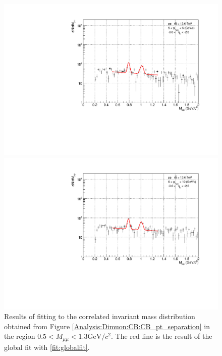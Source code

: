 \begin{figure}[H]
\begin{minipage}{0.45\textwidth}
                    \end{minipage}
                    \\
                    \vspace{1em}
                    \begin{minipage}{0.45\textwidth}
                        \centering
                        \includegraphics[width=\textwidth]{fig/3_4_2_fit_pt_5to6.pdf}
                        \captionsetup{labelformat=empty}
                        \caption*{$5 < p_{T\mu\mu} < 6\ \mathrm{GeV}/c$}
                    \end{minipage}
                    \hfill
                    \begin{minipage}{0.45\textwidth}
                        \centering
                        \includegraphics[width=\textwidth]{fig/3_4_2_fit_pt_6to10.pdf}
                        \captionsetup{labelformat=empty}
                        \caption*{$6 < p_{T\mu\mu} < 10\ \mathrm{GeV}/c$}
                    \end{minipage}
                    \caption{Results of fitting to the correlated invariant mass distribution obtained from Figure \ref{Analysis:Dimuon:CB:CB_pt_separation} in the region $0.5 < M_{\mu\mu} < 1.3 \mathrm{GeV}/c^2$. The red line is the result of the global fit with \ref{fit:globalfit}.}
                    \label{Analysis:Dimuon:Yield:fit}
                \end{figure}
